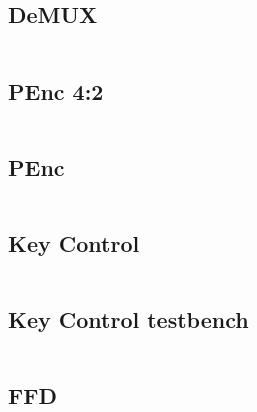 \documentclass[10pt,a4paper,twocolumn]{article}
\begin{document}
\subsection{DeMUX}
\label{sec:DeMUX_VHDL}
\begin{minipage}{\linewidth}
\footnotesize
\inputminted{vhdl}{vhdl/DeMUX.vhd}
\label{vhdl:DeMUX}
\end{minipage}

\subsection{PEnc 4:2}
\label{sec:PEnc42_VHDL}
\begin{minipage}{\linewidth}
\footnotesize
\inputminted{vhdl}{vhdl/Decoder.vhd}
\label{vhdl:PEnc42}
\end{minipage}

\subsection{PEnc}
\label{sec:PEnc_VHDL}
\begin{minipage}{\linewidth}
\footnotesize
\inputminted{vhdl}{vhdl/PEnc.vhd}
\label{vhdl:PEnc}
\end{minipage}

\subsection{Key Control}
\label{sec:KeyControl_VHDL}
\begin{minipage}{\linewidth}
\footnotesize
\inputminted{vhdl}{vhdl/KeyControl.vhd}
\label{vhdl:KeyControl}
\end{minipage}

\subsection{Key Control testbench}
\label{sec:KeyControl_tb_VHDL}
\begin{minipage}{\linewidth}
\footnotesize
\inputminted{vhdl}{vhdl/KeyControl_tb.vhd}
\label{vhdl:KeyControl_tb}
\end{minipage}

\subsection{FFD}
\label{sec:FFD_VHDL}
\begin{minipage}{\linewidth}
\footnotesize
\inputminted{vhdl}{vhdl/FFD.vhd}
\label{vhdl:FFD}
\end{minipage}
\end{document}

